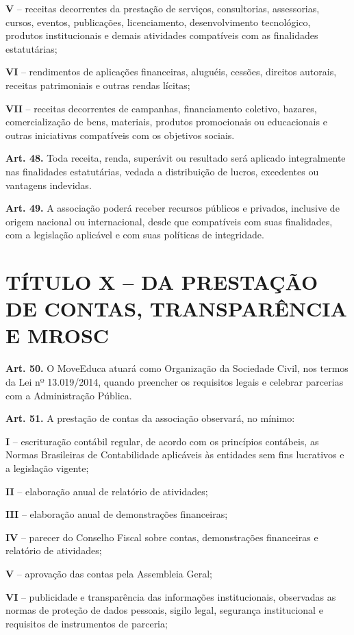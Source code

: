 \documentclass[11pt,a4paper]{article}
\begin{document}
\textbf{V} -- receitas decorrentes da prestação de serviços, consultorias, assessorias, cursos, eventos, publicações, licenciamento, desenvolvimento tecnológico, produtos institucionais e demais atividades compatíveis com as finalidades estatutárias;

\textbf{VI} -- rendimentos de aplicações financeiras, aluguéis, cessões, direitos autorais, receitas patrimoniais e outras rendas lícitas;

\textbf{VII} -- receitas decorrentes de campanhas, financiamento coletivo, bazares, comercialização de bens, materiais, produtos promocionais ou educacionais e outras iniciativas compatíveis com os objetivos sociais.

\textbf{Art. 48.} Toda receita, renda, superávit ou resultado será aplicado integralmente nas finalidades estatutárias, vedada a distribuição de lucros, excedentes ou vantagens indevidas.

\textbf{Art. 49.} A associação poderá receber recursos públicos e privados, inclusive de origem nacional ou internacional, desde que compatíveis com suas finalidades, com a legislação aplicável e com suas políticas de integridade.

\section*{TÍTULO X -- DA PRESTAÇÃO DE CONTAS, TRANSPARÊNCIA E MROSC}

\textbf{Art. 50.} O MoveEduca atuará como Organização da Sociedade Civil, nos termos da Lei nº 13.019/2014, quando preencher os requisitos legais e celebrar parcerias com a Administração Pública.

\textbf{Art. 51.} A prestação de contas da associação observará, no mínimo:

\textbf{I} -- escrituração contábil regular, de acordo com os princípios contábeis, as Normas Brasileiras de Contabilidade aplicáveis às entidades sem fins lucrativos e a legislação vigente;

\textbf{II} -- elaboração anual de relatório de atividades;

\textbf{III} -- elaboração anual de demonstrações financeiras;

\textbf{IV} -- parecer do Conselho Fiscal sobre contas, demonstrações financeiras e relatório de atividades;

\textbf{V} -- aprovação das contas pela Assembleia Geral;

\textbf{VI} -- publicidade e transparência das informações institucionais, observadas as normas de proteção de dados pessoais, sigilo legal, segurança institucional e requisitos de instrumentos de parceria;
\end{document}
